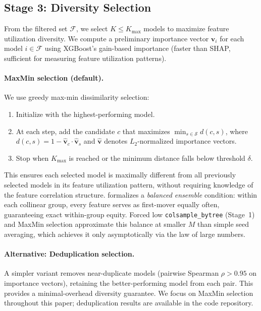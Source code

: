 \documentclass[10pt]{article}
\newcommand{\rhovar}{\rho}
\begin{document}
\subsection{Stage 3: Diversity Selection}

From the filtered set $\mathcal{F}$, we select $K \leq K_{\max}$
models to maximize feature utilization diversity. We compute a
preliminary importance vector $\mathbf{v}_i$ for each model $i \in
\mathcal{F}$ using XGBoost's gain-based importance (faster than SHAP,
sufficient for measuring feature utilization patterns).

\paragraph{MaxMin selection (default).}
We use greedy max-min dissimilarity selection:
\begin{enumerate}
  \item Initialize with the highest-performing model.
  \item At each step, add the candidate $c$ that maximizes
    $\min_{s \in \mathcal{S}} d(c, s)$, where
    $d(c, s) = 1 - \hat{\mathbf{v}}_c \cdot \hat{\mathbf{v}}_s$
    and $\hat{\mathbf{v}}$ denotes $L_2$-normalized importance vectors.
  \item Stop when $K_{\max}$ is reached or the minimum distance falls
    below threshold $\delta$.
\end{enumerate}

This ensures each selected model is maximally different from all previously
selected models in its feature utilization pattern, without requiring
knowledge of the feature correlation structure.
\citet{caraker2026impossibility} formalizes a
\emph{balanced ensemble} condition: within each collinear group, every
feature serves as first-mover equally often, guaranteeing exact
within-group equity.  Forced low \texttt{colsample\_bytree} (Stage~1)
and MaxMin selection approximate this balance at smaller $M$ than
simple seed averaging, which achieves it only asymptotically via the
law of large numbers.

\paragraph{Alternative: Deduplication selection.}
A simpler variant removes near-duplicate models (pairwise Spearman
$\rhovar > 0.95$ on importance vectors), retaining the better-performing
model from each pair. This provides a minimal-overhead diversity guarantee.
We focus on MaxMin selection throughout this paper; deduplication results
are available in the code repository.
\end{document}

